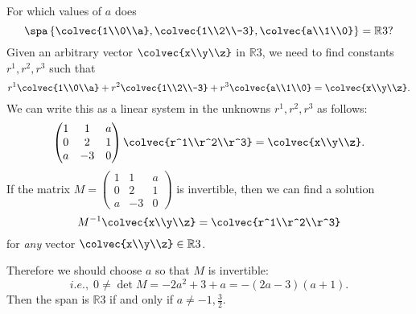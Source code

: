 \begin{example}
For which values of $a$ does
\[
\spa \left\{ \colvec{1\\0\\a} , \colvec{1\\2\\-3} , \colvec{a\\1\\0}   \right\} = \mathbb{R}3?
\]
Given an arbitrary vector $\colvec{x\\y\\z}$ in $\mathbb{R}3$, we need to find constants $r^1, r^2, r^3$ such that
\[
r^1 \colvec{1\\0\\a} + r^2\colvec{1\\2\\-3} +r^3 \colvec{a\\1\\0} = \colvec{x\\y\\z}.
\]
We can write this as a linear system in the unknowns $r^1, r^2, r^3$ as follows:
\[
\begin{pmatrix}
1 & 1 & a \\ 
0 & 2 & 1 \\
a & -3 & 0
\end{pmatrix}
\colvec{r^1\\r^2\\r^3}
= \colvec{x\\y\\z}.
\]
If the matrix $M=\begin{pmatrix}
1 & 1 & a \\ 
0 & 2 & 1 \\
a & -3 & 0
\end{pmatrix}$ is invertible, then we can find a solution 
\[
M^{-1}\colvec{x\\y\\z}=\colvec{r^1\\r^2\\r^3}
\]
for \emph{any} vector $\colvec{x\\y\\z} \in \mathbb{R}3$.

Therefore we should choose $a$ so that $M$ is invertible:  
\[
i.e.,\;  0 \neq \det M = -2a^2 + 3 + a = -(2a-3)(a+1). 
\]
Then the span is $\mathbb{R}3$ if and only if $a \neq -1, \frac{3}{2}$.
\end{example}



